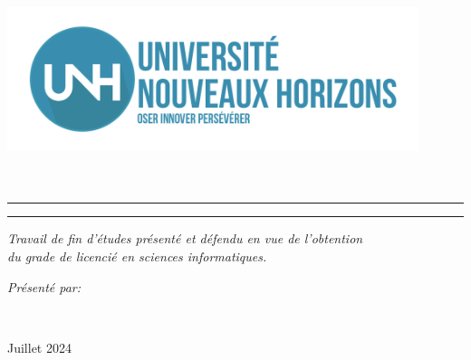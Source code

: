 \begin{titlepage}
    \begin{center}
        \large
        
        \vspace*{.03\textheight}
        \includegraphics[width=12cm]{Images/logo_unh} \\[0.75cm]
        
        {\LARGE{{\textsc{\myFaculty}}} }\\[0.2cm]
        
        {\LARGE{{{\myDepartment}}} }\\
        \medskip %
        
        \vspace{2.5cm} 
        \begin{center}
            \rule{0.9\textwidth}{.2pt}
        \end{center}
        \vspace{0.2cm}
        
        {\LARGE \bfseries {\myTitle}}
        
        \begin{center}
            \rule{0.9\textwidth}{.2pt}
        \end{center}

        \begin{flushright}
            {\slshape \textit{Travail de fin d’études présenté et défendu en vue de l’obtention\\ du grade de licencié en sciences informatiques.}}\\[2cm] 
        \end{flushright}
        
        \begin{minipage}[t]{0.55\textwidth}
            \begin{flushright}
                \large
                \emph{Présenté par:} \textbf{{\myName}}
            \end{flushright}
        \end{minipage}\\[3cm]
        \vfill
        
        {\large Juillet 2024}\\
    \end{center}
\end{titlepage}

